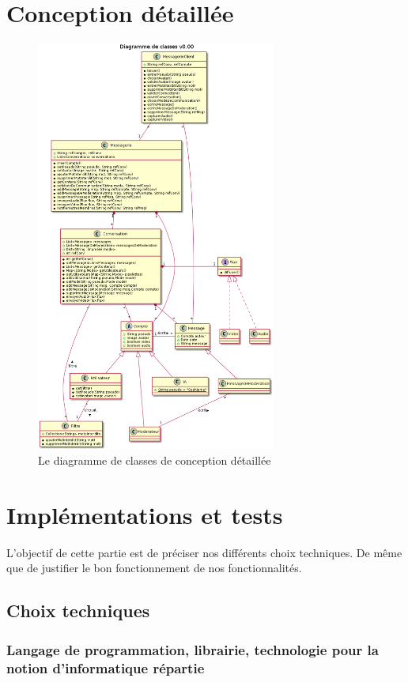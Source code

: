 \documentclass[11pt,dvipsnames,svgnames]{report}
\begin{document}
\chapter{Conception détaillée}
\begin{figure}[H]
\centerline{\includegraphics[width=0.7\textwidth]{diagrammes/detailedConception.png}}
\caption{Le diagramme de classes de conception détaillée}
\end{figure}
\chapter{Implémentations et tests}
L'objectif de cette partie est de préciser nos différents choix techniques. De même que de justifier le bon fonctionnement de nos fonctionnalités.
\section{Choix techniques}
\subsection{Langage de programmation, librairie, technologie pour la notion d'informatique répartie}
\end{document}
